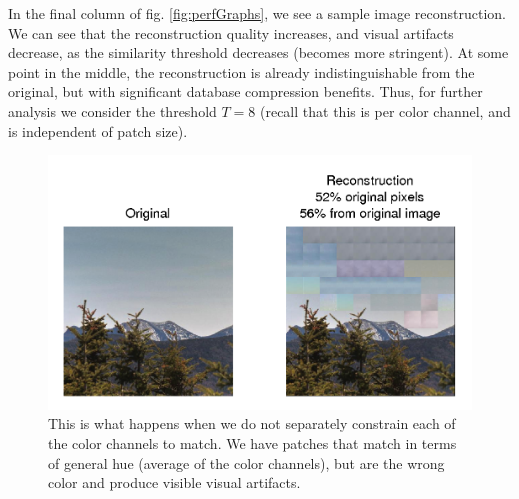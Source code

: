 In the final column of fig. \ref{fig:perfGraphs}, we see a sample image reconstruction. We can see that the reconstruction quality increases, and visual artifacts decrease, as the similarity threshold decreases (becomes more stringent). At some point in the middle, the reconstruction is already indistinguishable from the original, but with significant database compression benefits. Thus, for further analysis we consider the threshold $T=8$ (recall that this is per color channel, and is independent of patch size).


 \begin{figure}
\includegraphics[width=1\linewidth]{Figures/197.png}
\caption{This is what happens when we do not separately constrain each of the color channels to match. We have patches that match in terms of general hue (average of the color channels), but are the wrong color and produce visible visual artifacts.}
\label{fig:colProblem}
\end{figure}

